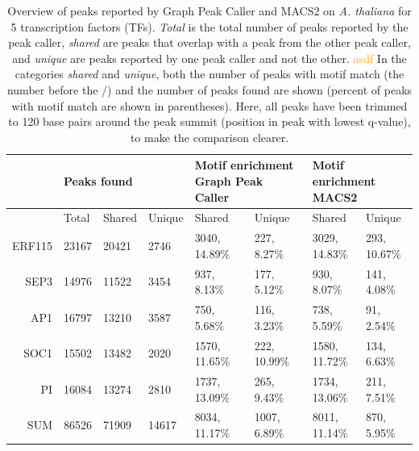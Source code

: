 \documentclass[10pt,letterpaper]{article}
\newcommand{\revision}[1]{\textcolor{orange}{#1}}
\begin{document}
\begin{table}[!ht]
\begin{adjustwidth}{-2.45in}{0in} %
\centering
\caption{Overview of peaks reported by Graph Peak Caller and MACS2 on \emph{A. thaliana} for 5 transcription factors (TFs).
  \emph{Total} is the total number of peaks reported by the peak caller,
  \emph{shared} are peaks that overlap with a peak from the other peak caller, and \emph{unique} are peaks reported by one peak caller and not the other. \revision{asdf}
  In the categories \emph{shared} and \emph{unique}, both the number of peaks with motif match (the number before the /) and the number of peaks found are shown (percent of peaks with motif match are shown in parentheses).
  Here, all peaks have been trimmed to 120 base pairs around the peak summit (position in peak with lowest q-value), to make the comparison clearer.}
\label{table1}
\begin{tabularx}{1.55\textwidth}{XXXXXXXX}
\toprule
& \multicolumn{3}{|l|}{Peaks found}  & \multicolumn{2}{l|}{Motif enrichment Graph Peak Caller} & \multicolumn{2}{l}{Motif enrichment MACS2}  \\ \midrule
& \multicolumn{1}{|l}{Total} & Shared & \multicolumn{1}{l|}{Unique} &  \multicolumn{1}{l}{Shared}  & \multicolumn{1}{l|}{Unique} & Shared & Unique  \\ \midrule
\multicolumn{1}{r|}{ERF115} & 23167 & 20421 & 2746 & 3040, 14.89\% & 227, 8.27\% & 3029, 14.83\% & 293, 10.67\%\\ 
\multicolumn{1}{r|}{SEP3} & 14976 & 11522 & 3454 & 937, 8.13\% & 177, 5.12\% & 930, 8.07\% & 141, 4.08\%\\ 
\multicolumn{1}{r|}{AP1} & 16797 & 13210 & 3587 & 750, 5.68\% & 116, 3.23\% & 738, 5.59\% & 91, 2.54\%\\ 
\multicolumn{1}{r|}{SOC1} & 15502 & 13482 & 2020 & 1570, 11.65\% & 222, 10.99\% & 1580, 11.72\% & 134, 6.63\%\\ 
\multicolumn{1}{r|}{PI} & 16084 & 13274 & 2810 & 1737, 13.09\% & 265, 9.43\% & 1734, 13.06\% & 211, 7.51\%\\ 
\multicolumn{1}{r|}{SUM} & 86526 & 71909 & 14617 & 8034, 11.17\% & 1007, 6.89\% & 8011, 11.14\% & 870, 5.95\%\\ 
\end{tabularx}
\end{adjustwidth}
\end{table}
\end{document}
